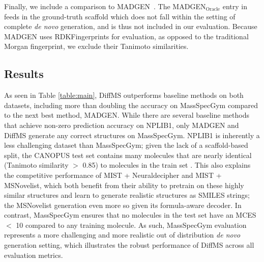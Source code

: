 \documentclass{article}
\theoremstyle{plain}
\theoremstyle{definition}
\theoremstyle{remark}
\newcommand{\ours}{DiffMS\xspace}
\begin{document}
Finally, we include a comparison to MADGEN~\citep{wang2025madgenmassspecattendsnovo}. The MADGEN$_{\text{Oracle}}$ entry in \citet{wang2025madgenmassspecattendsnovo} feeds in the ground-truth scaffold which %
does not fall within the setting of complete \emph{de novo} generation, and is thus not included in our evaluation. Because MADGEN uses RDKFingerprints for evaluation, as opposed to the traditional Morgan fingerprint, we exclude their Tanimoto similarities.


\subsection{Results}
As seen in Table \ref{table:main}, \ours outperforms baseline methods on both datasets, including more than doubling the accuracy on MassSpecGym compared to the next best method, MADGEN. While there are several baseline methods that achieve non-zero prediction accuracy on NPLIB1, only MADGEN and \ours generate any correct structures on MassSpecGym. NPLIB1 is inherently a less challenging dataset than MassSpecGym; given the lack of a scaffold-based split, the CANOPUS test set contains many molecules that are nearly identical (Tanimoto similarity $>$ 0.85) to molecules in the train set \citep{bushuiev2024massspecgymbenchmarkdiscoveryidentification}. This also explains the competitive performance of MIST + Neuraldecipher and MIST + MSNovelist, which both benefit from their ability to pretrain on these highly similar structures and learn to generate realistic structures as SMILES strings; the MSNovelist generation even more so given its formula-aware decoder. In contrast, MassSpecGym ensures that no molecules in the test set have an MCES $<$ 10 compared to any training molecule. As such, MassSpecGym evaluation represents a more challenging and more realistic out of distribution \textit{de novo} generation setting, which illustrates the robust performance of \ours across all evaluation metrics.
\end{document}
